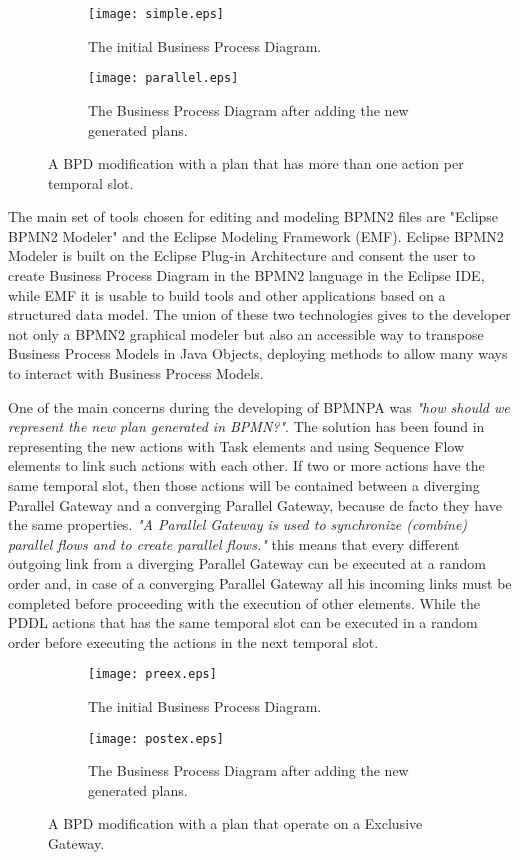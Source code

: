 \begin{figure}[h!]
	\centering
	\begin{subfigure}[b]{0.6\linewidth}
    	\texttt{[image: simple.eps]}
    	\caption{The initial Business Process Diagram.}
  	\end{subfigure}
	\begin{subfigure}[b]{1.05\linewidth}
    	\texttt{[image: parallel.eps]}
    	\caption{The Business Process Diagram after adding the new generated plans.}
  	\end{subfigure}
	\caption{A BPD modification with a plan that has more than one action per temporal slot.}
	\label{fig:coffee}
\end{figure}

The main set of tools chosen for editing and modeling BPMN2 files are "Eclipse BPMN2 Modeler" and the Eclipse Modeling Framework (EMF). Eclipse BPMN2 Modeler is built on the Eclipse Plug-in Architecture and consent the user to create Business Process Diagram in the BPMN2 language in the Eclipse IDE, while EMF it is usable to build tools and other applications based on a structured data model. The union of these two technologies gives to the developer not only a BPMN2 graphical modeler 	but also an accessible way to transpose Business Process Models in Java Objects, deploying methods to allow many ways to interact with Business Process Models.

One of the main concerns during the developing of BPMNPA was \textit{"how should we represent the new plan generated in BPMN?"}. 
The solution has been found in representing the new actions with Task elements and using Sequence Flow elements to link such actions with each other. If two or more actions have the same temporal slot, then those actions will be contained between a diverging Parallel Gateway and a converging Parallel Gateway, because de facto they have the same properties. 
\textit{"A Parallel Gateway is used to synchronize (combine) parallel flows and to create parallel flows."}\cite{bpmn2doc} this means that every different outgoing link from a diverging Parallel Gateway can be executed at a random order and, in case of a converging Parallel Gateway all his incoming links must be completed before proceeding with the execution of other elements. While the PDDL actions that has the same temporal slot can be executed in a random order before executing the actions in the next temporal slot.

\begin{figure}[h!]
	\centering
	\begin{subfigure}[b]{0.7\linewidth}
    	\texttt{[image: preex.eps]}
    	\caption{The initial Business Process Diagram.}
  	\end{subfigure}
	\begin{subfigure}[b]{0.85\linewidth}
    	\texttt{[image: postex.eps]}
    	\caption{The Business Process Diagram after adding the new generated plans.}
  	\end{subfigure}
	\caption{A BPD modification with a plan that operate on a Exclusive Gateway.}
	\label{fig:coffee}
\end{figure}

